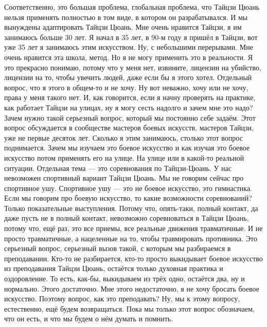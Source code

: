 Соответственно,  
это большая проблема, глобальная проблема, что Тайцзи Цюань
нельзя применять полностью в том виде, в котором 
он разрабатывался. И мы вынуждены адаптировать 
Тайцзи Цюань. Мне очень нравится Тайцзи, я им занимаюсь 
больше 30 лет. Я начал в 35 лет, в 90-м году я пришёл в Тайцзи, 
вот уже 35 лет я занимаюсь этим искусством. Ну, с 
небольшими перерывами. Мне очень нравится эта школа,  
метод. Но я не могу применить это в реальности. Я это 
прекрасно понимаю, потому что у меня нет, извините, 
лицензии на убийство, лицензии на то, чтобы увечить 
людей, даже если бы я этого хотел. Отдельный вопрос, 
что я этого в общем-то и не хочу. Ну вот неважно, хочу 
или не хочу, права у меня такого нет. И, как говорится,  
если я начну проверять на практике, как работает 
Тайцзи на улицах, ну я могу сесть надолго и зачем мне 
это надо? Зачем нужно такой серьезный вопрос, который 
мы постоянно себе задаём. Этот вопрос обсуждается в 
сообществе мастеров боевых искусств, мастеров Тайцзи,
уже не первые десяток лет. Сколько я этим занимаюсь, 
столько этот вопрос поднимается. Зачем мы изучаем 
это боевое искусство и как изучая это боевое 
искусство потом применять его на улице. На улице или в 
какой-то реальной ситуации. Отдельная тема --- это 
соревнования по Тайцзи-Цюань. У нас 
невозможен спортивный вариант Тайцзи Цюань. Мы не 
говорим сейчас про спортивное ушу. Спортивное ушу --- 
это не боевое искусство, это гимнастика. Если мы 
говорим про боевую искусство, то какие возможности 
соревнований? Только показательные выступления.  
Потому что, опять-таки,  полный контакт, да даже пусть 
не в полный контакт, невозможно соревноваться в 
Тайцзи Цюань, потому что, ещё раз, это все приемы, все 
реальные движения травматичные. И не просто
травматичные, а нацеленные на то, чтобы травмировать 
противника. Это серьезный вопрос,  серьезный вызов 
такой, с которым мы разбираемся в преподавании. Кто-то 
не разбирается, кто-то просто выкидывает боевое 
искусство из преподавания Тайцзи Цюань, остаётся 
только духовная практика и оздоровление. То есть, как-бы,
выкидываем из трёх одно, остаётся два, ну и 
нормально. Этого достаточно. Мне этого недостаточно, 
я не хочу бросать боевое искусство. Поэтому вопрос, 
как это преподавать? Ну, мы к этому вопросу, 
естественно, ещё будем возвращаться. Пока мы только 
этот вопрос обозначаем, что он есть, и что мы будем о 
нём думать и помнить.

